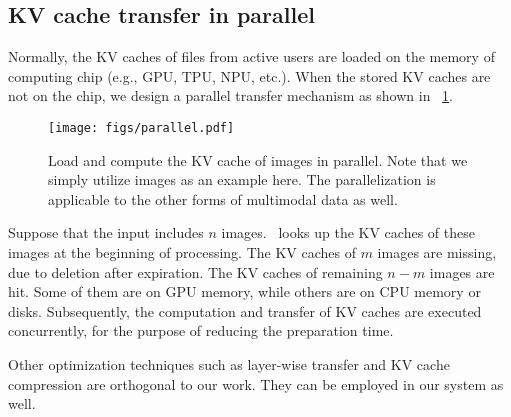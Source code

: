 \subsection{KV cache transfer in parallel}
Normally, the KV caches of files from active users are loaded on the memory of computing chip (e.g., GPU, TPU, NPU, etc.). When the stored KV caches are not on the chip, we design a parallel transfer mechanism as shown in \figurename~\ref{fig:parallel}.
\begin{figure}
    \centering
    \texttt{[image: figs/parallel.pdf]}
    \caption{Load and compute the KV cache of images in parallel. Note that we simply utilize images as an example here. The parallelization is applicable to the other forms of multimodal data as well.}
    \label{fig:parallel}
\end{figure}

Suppose that the input includes $n$ images. \sys~looks up the KV caches of these images at the beginning of processing. The KV caches of $m$ images are missing, due to deletion after expiration. The KV caches of remaining $n-m$ images are hit. Some of them are on GPU memory, while others are on CPU memory or disks. Subsequently, the computation and transfer of KV caches are executed concurrently, for the purpose of reducing the preparation time.

Other optimization techniques such as layer-wise transfer \cite{patel2024} and KV cache compression \cite{liu2024} are orthogonal to our work. They can be employed in our system as well.